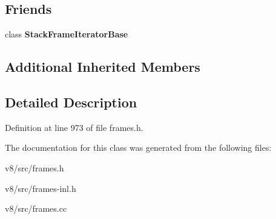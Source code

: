 \subsection*{Friends}
\begin{DoxyCompactItemize}
\item 
\mbox{\label{classv8_1_1internal_1_1WasmInterpreterEntryFrame_ac7310421866976ca454bbe11c5f926c3}} 
class {\bfseries Stack\+Frame\+Iterator\+Base}
\end{DoxyCompactItemize}
\subsection*{Additional Inherited Members}


\subsection{Detailed Description}


Definition at line 973 of file frames.\+h.



The documentation for this class was generated from the following files\+:\begin{DoxyCompactItemize}
\item 
v8/src/frames.\+h\item 
v8/src/frames-\/inl.\+h\item 
v8/src/frames.\+cc\end{DoxyCompactItemize}
